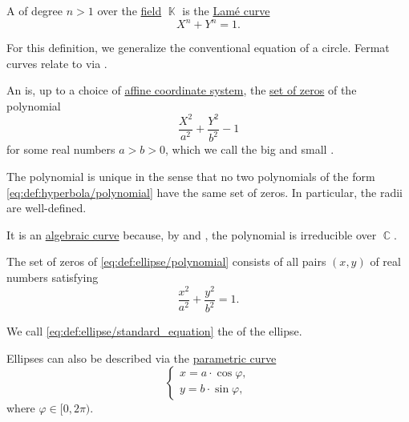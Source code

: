 \begin{definition}\label{def:fermat_curve}\mimprovised
  A  of degree \( n > 1 \) over the \hyperref[def:field]{field} \( \BbbK \) is the \hyperref[def:lame_curve]{Lam\'{e} curve}
  \begin{equation}\label{eq:def:fermat_curve}
    X^n + Y^n = 1.
  \end{equation}
\end{definition}
\begin{comments}
  \item For this definition, we generalize the conventional equation of a circle. Fermat curves relate to  via .
\end{comments}

\begin{definition}\label{def:ellipse}
  An  is, up to a choice of \hyperref[def:affine_coordinate_system]{affine coordinate system}, the \hyperref[def:root_of_polynomial]{set of zeros} of the polynomial
  \begin{equation}\label{eq:def:ellipse/polynomial}
    \frac {X^2} {a^2} + \frac {Y^2} {b^2} - 1
  \end{equation}
  for some real numbers \( a > b > 0 \), which we call the big and small .

  The polynomial is unique in the sense that no two polynomials of the form \eqref{eq:def:hyperbola/polynomial} have the same set of zeros. In particular, the radii are well-defined.

  It is an \hyperref[def:affine_algebraic_set/curve]{algebraic curve} because, by  and , the polynomial is irreducible over \( \BbbC \).

  \begin{thmenum}
     The set of zeros of \eqref{eq:def:ellipse/polynomial} consists of all pairs \( (x, y) \) of real numbers satisfying
    \begin{equation}\label{eq:def:ellipse/standard_equation}
      \frac {x^2} {a^2} + \frac {y^2} {b^2} = 1.
    \end{equation}

    We call \eqref{eq:def:ellipse/standard_equation} the  of the ellipse.

     Ellipses can also be described via the \hyperref[def:parametric_curve]{parametric curve}
    \begin{equation}\label{eq:def:ellipse/parametric_equation}
      \begin{cases}
        x = a \cdot \cos \varphi, \\
        y = b \cdot \sin \varphi,
      \end{cases}
    \end{equation}
    where \( \varphi \in [0, 2\pi) \).
  \end{thmenum}


\end{definition}

